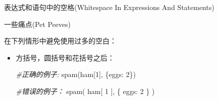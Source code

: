\documentclass[ignorenonframetext,9pt]{beamer}
\newenvironment{Shaded}{}{}
\newcommand{\CommentTok}[1]{\textcolor[rgb]{0.38,0.63,0.69}{\textit{#1}}}
\newcommand{\DecValTok}[1]{\textcolor[rgb]{0.25,0.63,0.44}{#1}}
\newcommand{\NormalTok}[1]{#1}
\begin{document}

\begin{frame}[fragile]{表达式和语句中的空格(Whitespace In Expressions
And Statements)}
\protect\hypertarget{ux8868ux8fbeux5f0fux548cux8bedux53e5ux4e2dux7684ux7a7aux683cwhitespace-in-expressions-and-statements}{}

\begin{block}{一些痛点(Pet Peeves)}

在下列情形中避免使用过多的空白：

\begin{itemize}
\item
  方括号，圆括号和花括号之后：

\begin{Shaded}
\begin{Highlighting}[]
\CommentTok{#正确的例子:}
\NormalTok{spam(ham[}\DecValTok{1}\NormalTok{], \{eggs: }\DecValTok{2}\NormalTok{\})}

\CommentTok{#错误的例子：}
\NormalTok{spam( ham[ }\DecValTok{1}\NormalTok{ ], \{ eggs: }\DecValTok{2}\NormalTok{ \} )}
\end{Highlighting}
\end{Shaded}
\end{itemize}
\end{block}

\end{frame}
\end{document}
